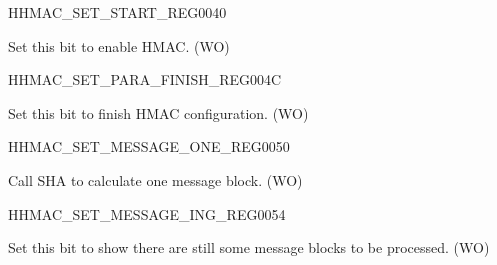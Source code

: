 \begin{register}{H}{HMAC\_SET\_START\_REG}{\hexprefix{}0040}\label{regdesc:HMACSETSTARTREG}
%
%
\regnewline%
\begin{regdesc}\begin{reglist}
\label{fielddesc:HMACSETSTART}\item [HMAC\_SET\_START] Set this bit to enable HMAC. (WO)
\end{reglist}\end{regdesc}
\end{register}


\begin{register}{H}{HMAC\_SET\_PARA\_FINISH\_REG}{\hexprefix{}004C}\label{regdesc:HMACSETPARAFINISHREG}
%
%
\regnewline%
\begin{regdesc}\begin{reglist}
\label{fielddesc:HMACSETPARAEND}\item [HMAC\_SET\_PARA\_END] Set this bit to finish HMAC configuration. (WO)
\end{reglist}\end{regdesc}
\end{register}


\begin{register}{H}{HMAC\_SET\_MESSAGE\_ONE\_REG}{\hexprefix{}0050}\label{regdesc:HMACSETMESSAGEONEREG}
%
%
\regnewline%
\begin{regdesc}\begin{reglist}
\label{fielddesc:HMACSETTEXTONE}\item [HMAC\_SET\_TEXT\_ONE] Call SHA to calculate one message block. (WO)
\end{reglist}\end{regdesc}
\end{register}


\begin{register}{H}{HMAC\_SET\_MESSAGE\_ING\_REG}{\hexprefix{}0054}\label{regdesc:HMACSETMESSAGEINGREG}
%
%
\regnewline%
\begin{regdesc}\begin{reglist}
\label{fielddesc:HMACSETTEXTING}\item [HMAC\_SET\_TEXT\_ING] Set this bit to show there are still some message blocks to be processed. (WO)
\end{reglist}\end{regdesc}
\end{register}


